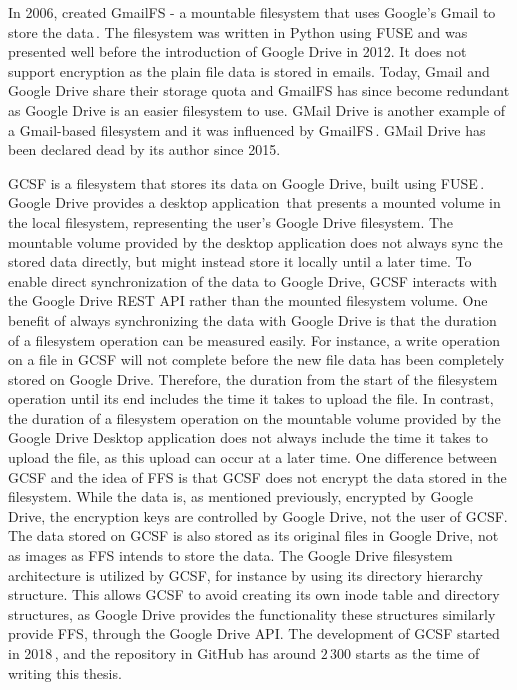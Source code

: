 In 2006, \citeauthor{jonesGoogleHackUse2006} created GmailFS - a mountable filesystem that uses Google's Gmail to store the data\,\cite{jonesGoogleHackUse2006, jonesGmailFilesystemImplementation2006}. The filesystem was written in Python using \gls{FUSE} and was presented well before the introduction of Google Drive in 2012. It does not support encryption as the plain file data is stored in emails. Today, Gmail and Google Drive share their storage quota and GmailFS has since become redundant as Google Drive is an easier filesystem to use. GMail Drive is another example of a \mbox{Gmail-based} filesystem and it was influenced by GmailFS\,\cite{viksoeViksoeDkGMail2004}. GMail Drive has been declared dead by its author since 2015.

\gls{GCSF} is a filesystem that stores its data on Google Drive, built using \gls{FUSE}\,\cite{sergiudanGCSFVirtualFile2018,sergiudanHarababurelGcsf2021}. Google Drive provides a desktop application\,\cite{googleInstallSetGoogle} that presents a mounted volume in the local filesystem, representing the user's Google Drive filesystem. The mountable volume provided by the desktop application does not always sync the stored data directly, but might instead store it locally until a later time. To enable direct synchronization of the data to Google Drive, \gls{GCSF} interacts with the Google Drive REST \gls{API} rather than the mounted filesystem volume. One benefit of always synchronizing the data with Google Drive is that the duration of a filesystem operation can be measured easily. For instance, a write operation on a file in \gls{GCSF} will not complete before the new file data has been completely stored on Google Drive. Therefore, the duration from the start of the filesystem operation until its end includes the time it takes to upload the file. In contrast, the duration of a filesystem operation on the mountable volume provided by the Google Drive Desktop application does not always include the time it takes to upload the file, as this upload can occur at a later time. One difference between \gls{GCSF} and the idea of \gls{FFS} is that \gls{GCSF} does not encrypt the data stored in the filesystem. While the data is, as mentioned previously, encrypted by Google Drive, the encryption keys are controlled by Google Drive, not the user of \gls{GCSF}. The data stored on \gls{GCSF} is also stored as its original files in Google Drive, not as images as \gls{FFS} intends to store the data. The Google Drive filesystem architecture is utilized by \gls{GCSF}, for instance by using its directory hierarchy structure. This allows \gls{GCSF} to avoid creating its own inode table and directory structures, as Google Drive provides the functionality these structures similarly provide \gls{FFS}, through the Google Drive \gls{API}. The development of \gls{GCSF} started in 2018\,\cite{sergiudanHarababurelGcsf2021}, and the repository in GitHub has around $2\,300$ starts as the time of writing this thesis. 

